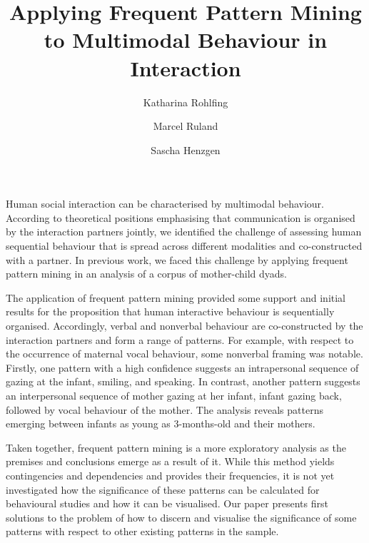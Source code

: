 \documentclass[DIV=calc,BCOR=0mm,pagesize]{scrartcl}
\title{Applying Frequent Pattern Mining to Multimodal Behaviour in Interaction}
\author{Katharina Rohlfing \and Marcel Ruland \and Sascha Henzgen}
\date{}  %
\begin{document}
\maketitle
\thispagestyle{empty}
Human social interaction can be characterised by multimodal behaviour.
According to theoretical positions emphasising that communication is organised by the interaction partners jointly, we identified the challenge of assessing human sequential behaviour that is spread across different modalities and co-constructed with a partner.
In previous work, we faced this challenge by applying frequent pattern mining in an analysis of a corpus of mother-child dyads.

The application of frequent pattern mining provided some support and initial results for the proposition that human interactive behaviour is sequentially organised.
Accordingly, verbal and nonverbal behaviour are co-constructed by the interaction partners and form a range of patterns.
For example, with respect to the occurrence of maternal vocal behaviour, some nonverbal framing was notable.
Firstly, one pattern with a high confidence suggests an intrapersonal sequence of gazing at the infant, smiling, and speaking.
In contrast, another pattern suggests an interpersonal sequence of mother gazing at her infant, infant gazing back, followed by vocal behaviour of the mother.
The analysis reveals patterns emerging between infants as young as 3-months-old and their mothers.

Taken together, frequent pattern mining is a more exploratory analysis as the premises and conclusions emerge as a result of it.
While this method yields contingencies and dependencies and provides their frequencies, it is not yet investigated how the significance of these patterns can be calculated for behavioural studies and how it can be visualised.
Our paper presents first solutions to the problem of how to discern and visualise the significance of some patterns with respect to other existing patterns in the sample.
\end{document}
